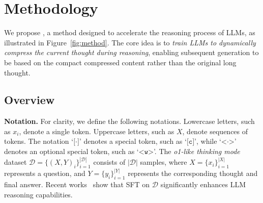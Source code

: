

\section{Methodology}
We propose \textbf{\ours}, a method designed to accelerate the reasoning process of LLMs, as illustrated in Figure~\ref{fig:method}.
The core idea is to \textit{train LLMs to dynamically compress the current thought during reasoning}, enabling subsequent generation to be based on the compact compressed content rather than the original long thought.

\subsection{Overview}

\textbf{Notation.}
For clarity, we define the following notations.
Lowercase letters, such as $x_i$, denote a single token.
Uppercase letters, such as $X$, denote sequences of tokens.
The notation `$\texttt{[·]}$' denotes a special token, such as `$\texttt{[c]}$', while `$\texttt{<·>}$' denotes an optional special token, such as `$\texttt{<w>}$'.
The \textit{o1-like thinking mode} dataset $\mathcal{D}=\{(X,Y)_i\}_{i=1}^{|\mathcal{D}|}$ consists of $|\mathcal{D}|$ samples, where $X=\{x_i\}_{i=1}^{|X|}$ represents a question, and $Y=\{y_i\}_{i=1}^{|Y|}$ represents the corresponding thought and final answer. 
Recent works~\citep{arxiv25_openthoughts,arxiv25_deepseek_r1} show that SFT on $\mathcal{D}$ significantly enhances LLM reasoning capabilities.

